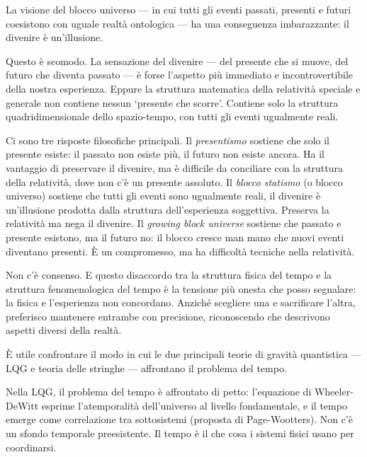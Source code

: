 \documentclass[12pt,a4paper,openany]{book}
\newcommand{\sezione}[1]{\vspace{1.2em}{\large\bfseries #1}\vspace{0.5em}\par}
\begin{document}
\sezione{Il blocco universo e il paradosso del divenire}

La visione del blocco universo --- in cui tutti gli eventi passati, presenti e futuri coesistono con uguale realtà ontologica --- ha una conseguenza imbarazzante: il divenire è un'illusione.

Questo è scomodo. La sensazione del divenire --- del presente che si muove, del futuro che diventa passato --- è forse l'aspetto più immediato e incontrovertibile della nostra esperienza. Eppure la struttura matematica della relatività speciale e generale non contiene nessun `presente che scorre'. Contiene solo la struttura quadridimensionale dello spazio-tempo, con tutti gli eventi ugualmente reali.

Ci sono tre risposte filosofiche principali. Il \textit{presentismo} sostiene che solo il presente esiste: il passato non esiste più, il futuro non esiste ancora. Ha il vantaggio di preservare il divenire, ma è difficile da conciliare con la struttura della relatività, dove non c'è un presente assoluto. Il \textit{blocco statismo} (o blocco universo) sostiene che tutti gli eventi sono ugualmente reali, il divenire è un'illusione prodotta dalla struttura dell'esperienza soggettiva. Preserva la relatività ma nega il divenire. Il \textit{growing block universe} sostiene che passato e presente esistono, ma il futuro no: il blocco cresce man mano che nuovi eventi diventano presenti. È un compromesso, ma ha difficoltà tecniche nella relatività.

Non c'è consenso. E questo disaccordo tra la struttura fisica del tempo e la struttura fenomenologica del tempo è la tensione più onesta che posso segnalare: la fisica e l'esperienza non concordano. Anziché scegliere una e sacrificare l'altra, preferisco mantenere entrambe con precisione, riconoscendo che descrivono aspetti diversi della realtà.

\sezione{Il tempo nelle teorie di gravità quantistica: LQG e stringhe a confronto}

È utile confrontare il modo in cui le due principali teorie di gravità quantistica --- LQG e teoria delle stringhe --- affrontano il problema del tempo.

Nella LQG, il problema del tempo è affrontato di petto: l'equazione di Wheeler-DeWitt esprime l'atemporalità dell'universo al livello fondamentale, e il tempo emerge come correlazione tra sottosistemi (proposta di Page-Wootters). Non c'è un sfondo temporale preesistente. Il tempo è il che cosa i sistemi fisici usano per coordinarsi.
\end{document}
